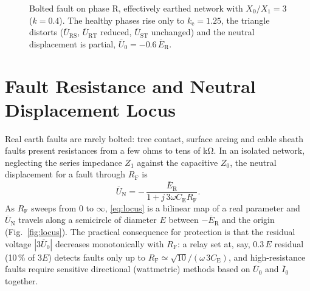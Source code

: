 \documentclass[a4paper,11pt]{article}
\newcommand{\ph}[1]{\mathrm{#1}}
\newcommand{\pE}[1]{\overline{E}_{\ph{#1}}}
\newcommand{\pU}[1]{\overline{U}_{\ph{#1}}}
\newcommand{\pI}[1]{\overline{I}_{#1}}
\begin{document}
\begin{figure}[htb]
\centering
{}
\caption{Bolted fault on phase R, effectively earthed network with
$X_{0}/X_{1}=3$ ($k=0.4$). The healthy phases rise only to
$k_\mathrm{e}=1.25$, the triangle distorts ($\pU{RS}$, $\pU{RT}$ reduced,
$\pU{ST}$ unchanged) and the neutral displacement is partial,
$\overline{U}_{0}=-0.6\,\pE{R}$.}
\label{fig:effective}
\end{figure}

\section{Fault Resistance and Neutral Displacement Locus}
\label{sec:locus}

Real earth faults are rarely bolted: tree contact, surface arcing and cable
sheath faults present resistances from a few ohms to tens of
\si{\kilo\ohm}. In an isolated network, neglecting the series impedance
$Z_{1}$ against the capacitive $Z_{0}$, the neutral displacement for a fault
through $R_\mathrm{F}$ is
\begin{equation}
\overline{U}_\mathrm{N}
 = -\,\frac{\pE{R}}{1+j\,3\omega C_\mathrm{E} R_\mathrm{F}} .
\label{eq:locus}
\end{equation}
As $R_\mathrm{F}$ sweeps from $0$ to $\infty$, \eqref{eq:locus} is a bilinear
map of a real parameter and $\overline{U}_\mathrm{N}$ travels along a
semicircle of diameter $E$ between $-\pE{R}$ and the origin
(Fig.~\ref{fig:locus}). The practical consequence for protection is that the
residual voltage $|3\overline{U}_{0}|$ decreases monotonically with
$R_\mathrm{F}$: a relay set at, say, $0.3\,E$ residual (10\,\% of $3E$)
detects faults only up to
$R_\mathrm{F} \simeq \sqrt{10}/(\omega\,3 C_\mathrm{E})$, and
high-resistance faults require sensitive directional (wattmetric) methods
based on $\overline{U}_{0}$ and $\pI{0}$ together.
\end{document}
